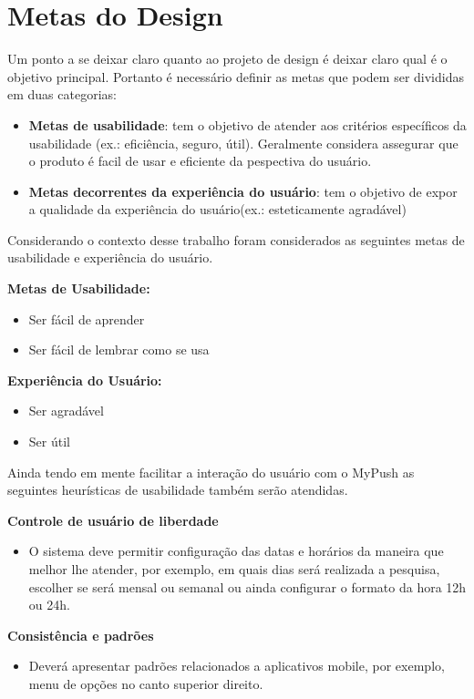 \chapter[Metas do Design]{Metas do Design}

Um ponto a se deixar claro quanto ao projeto de design é deixar claro qual é o objetivo principal. Portanto é necessário definir as metas que podem ser divididas em duas categorias:
\begin{itemize}
	\item \textbf{Metas de usabilidade}: tem o objetivo de atender aos critérios específicos da usabilidade (ex.: eficiência, seguro, útil). Geralmente considera assegurar que o produto é facil de usar e eficiente da pespectiva do usuário.
	\item \textbf{Metas decorrentes da experiência do usuário}: tem o objetivo de expor a qualidade da experiência do usuário(ex.: esteticamente agradável)
\end{itemize}

Considerando o contexto desse trabalho foram considerados as seguintes metas de usabilidade e experiência do usuário.

\textbf{Metas de Usabilidade:}
\begin{itemize}
	\item Ser fácil de aprender
	\item Ser fácil de lembrar como se usa
\end{itemize}	

\textbf{Experiência do Usuário:}
\begin{itemize}
	\item Ser agradável
	\item Ser útil
\end{itemize}


Ainda tendo em mente facilitar a interação do usuário com o MyPush as seguintes heurísticas de usabilidade também serão atendidas.

\textbf{Controle de usuário de liberdade}
\begin{itemize}
	\item O sistema deve permitir configuração das datas e horários da maneira que melhor lhe atender, por exemplo, em quais dias será realizada a pesquisa, escolher se será mensal ou semanal ou ainda configurar o formato da hora 12h ou 24h.
\end{itemize}

\textbf{Consistência e padrões}
\begin{itemize}
	\item Deverá apresentar padrões relacionados a aplicativos mobile, por exemplo, menu de opções no canto superior direito.
\end{itemize}

